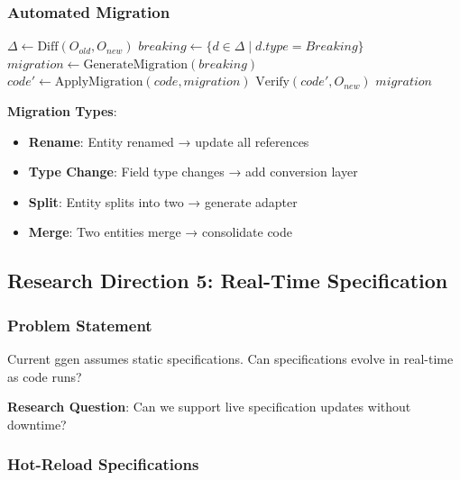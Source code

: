\subsubsection{Automated Migration}

\begin{algorithm}
\caption{Specification Migration}
\begin{algorithmic}[1]
    \State $\Delta \gets \text{Diff}(O_{old}, O_{new})$
    \State $breaking \gets \{d \in \Delta \mid d.type = Breaking\}$
    \State $migration \gets \text{GenerateMigration}(breaking)$
        \State $code' \gets \text{ApplyMigration}(code, migration)$
        \State $\text{Verify}(code', O_{new})$
    \EndFor
    \State \Return $migration$
\EndProcedure
\end{algorithmic}
\end{algorithm}

\textbf{Migration Types}:
\begin{itemize}
    \item \textbf{Rename}: Entity renamed → update all references
    \item \textbf{Type Change}: Field type changes → add conversion layer
    \item \textbf{Split}: Entity splits into two → generate adapter
    \item \textbf{Merge}: Two entities merge → consolidate code
\end{itemize}

\subsection{Research Direction 5: Real-Time Specification}

\subsubsection{Problem Statement}

Current ggen assumes static specifications. Can specifications evolve in real-time as code runs?

\textbf{Research Question}: Can we support live specification updates without downtime?

\subsubsection{Hot-Reload Specifications}

